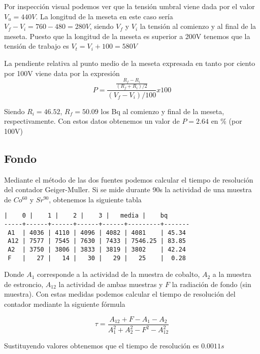 \documentclass[11pt]{article}
\begin{document}
    Por inspección visual podemos ver que la tensión umbral viene dada por
el valor \(V_u=440V\). La longitud de la meseta en este caso sería
\(V_f - V_i = 760 - 480 = 280V\), siendo \(V_f\) y \(V_i\) la tensión al
comienzo y al final de la meseta. Puesto que la longitud de la meseta es
superior a 200V tenemos que la tensión de trabajo es
\(V_t = V_i + 100 =580V\)

    

    La pendiente relativa al punto medio de la meseta expresada en tanto por
ciento por 100V viene data por la expresión \[
P = \frac{\frac{R_f - R_i}{(R_f + R_i)/2}}{(V_f - V_i)/100}x100
\]
 
            
    
    Siendo \(R_i = 46.52\), \(R_f=50.09\) los Bq al comienzo y final de la
meseta, respectivamente. Con estos datos obtenemos un valor de
\(P=2.64\) en \% (por 100V)

    

    \hypertarget{fondo}{%
\subsection{Fondo}\label{fondo}}

    Mediante el método de las dos fuentes podemos calcular el tiempo de
resolución del contador Geiger-Muller. Si se mide durante 90s la
actividad de una muestra de \(Co^{60}\) y \(Sr^{90}\), obtenemos la
siguiente tabla

    \begin{Verbatim}[commandchars=\\\{\}]
     |    0 |    1 |    2 |    3 |   media |    bq
-----+------+------+------+------+---------+-------
 A1  | 4036 | 4110 | 4096 | 4082 | 4081    | 45.34
 A12 | 7577 | 7545 | 7630 | 7433 | 7546.25 | 83.85
 A2  | 3750 | 3806 | 3833 | 3819 | 3802    | 42.24
 F   |   27 |   14 |   30 |   29 |   25    |  0.28
    \end{Verbatim}

    Donde \(A_1\) corresponde a la actividad de la muestra de cobalto,
\(A_2\) a la muestra de estroncio, \(A_{12}\) la actividad de ambas
muestras y \(F\) la radiación de fondo (sin muestra). Con estas medidas
podemos calcular el tiempo de resolución del contador mediante la
siguiente fórmula

\[
\tau = \frac{A_{12} + F - A_1 - A_2}{A_1^2 + A_2^2 - F^2 - A_{12}^2}
\]
 
            
    
    Sustituyendo valores obtenemos que el tiempo de resolución es
\(0.0011s\)
\end{document}
